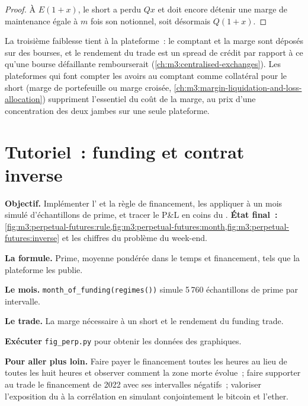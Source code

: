 \begin{proof}
À $E(1+x)$, le short a perdu $Qx$ et doit encore détenir une marge de maintenance égale à $m$ fois son notionnel, soit désormais $Q(1+x)$.
\end{proof}

La troisième faiblesse tient à la plateforme~: le comptant et la marge sont déposés sur des bourses, et le rendement du trade est un spread de crédit
par rapport à ce qu'une bourse défaillante rembourserait (\cref{ch:m3:centralised-exchanges}). Les plateformes qui font compter les avoirs au comptant comme
collatéral pour le short (marge de portefeuille ou marge croisée, \cref{ch:m3:margin-liquidation-and-loss-allocation}) suppriment
l'essentiel du coût de la marge, au prix d'une concentration des deux jambes sur une seule plateforme.

\section{Tutoriel~: funding et contrat inverse}\label{tut:m3:perpetual-futures:funding}

\begin{tutorial}
\textbf{Objectif.} Implémenter l' et la règle de financement, les appliquer à un mois simulé d'échantillons de prime,
et tracer le P\&L en coins du . \textbf{État final~:}
\cref{fig:m3:perpetual-futures:rule,fig:m3:perpetual-futures:month,fig:m3:perpetual-futures:inverse} et les chiffres
du problème du week-end.
\begin{tutsteps}
\item \textbf{La formule.} Prime, moyenne pondérée dans le temps et financement, tels que la plateforme les publie.
\label{lst:m3:perpetual-futures:funding}
\item \textbf{Le mois.} \texttt{month\_of\_funding(regimes())} simule 5\,760 échantillons de prime par intervalle.
\item \textbf{Le trade.} La marge nécessaire à un short et le rendement du funding trade.
\label{lst:m3:perpetual-futures:trade}
\item \textbf{Exécuter} \texttt{fig\_perp.py} pour obtenir les données des graphiques.
\end{tutsteps}
\textbf{Pour aller plus loin.} Faire payer le financement toutes les heures au lieu de toutes les huit heures et observer comment la zone morte
évolue~; faire supporter au trade le financement de 2022 avec ses intervalles négatifs~; valoriser l'exposition du  à la corrélation en simulant
conjointement le bitcoin et l'ether.
\end{tutorial}

